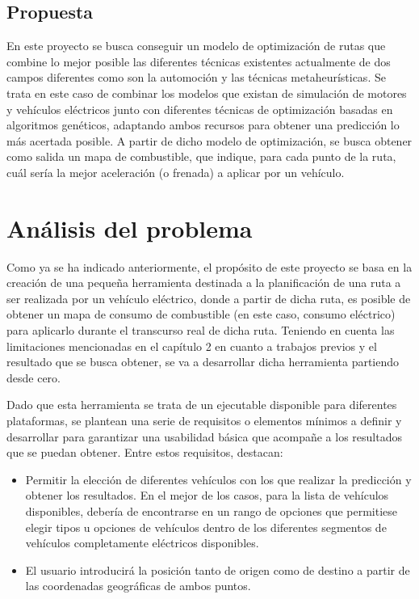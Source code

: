\documentclass[11pt,spanish,listoffigures,listoftables]{tfgetsinf}
\begin{document}
\section{Propuesta}
En este proyecto se busca conseguir un modelo de optimización de rutas que combine lo mejor posible las diferentes técnicas existentes actualmente de dos campos diferentes como son la automoción y las técnicas metaheurísticas. Se trata en este caso de combinar los modelos que existan de simulación de motores y vehículos eléctricos junto con diferentes técnicas de optimización basadas en algoritmos genéticos, adaptando ambos recursos para obtener una predicción lo más acertada posible. A partir de dicho modelo de optimización, se busca obtener como salida un mapa de combustible, que indique, para cada punto de la ruta, cuál sería la mejor aceleración (o frenada) a aplicar por un vehículo.

\chapter{Análisis del problema}
\label{AnalisisProblema}
Como ya se ha indicado anteriormente, el propósito de este proyecto se basa en la creación de una pequeña herramienta destinada a la planificación de una ruta a ser realizada por un vehículo eléctrico, donde a partir de dicha ruta, es posible de obtener un mapa de consumo de combustible (en este caso, consumo eléctrico) para aplicarlo durante el transcurso real de dicha ruta. Teniendo en cuenta las limitaciones mencionadas en el capítulo 2 en cuanto a trabajos previos y el resultado que se busca obtener, se va a desarrollar dicha herramienta partiendo desde cero.

Dado que esta herramienta se trata de un ejecutable disponible para diferentes plataformas, se plantean una serie de requisitos o elementos mínimos a definir y desarrollar para garantizar una usabilidad básica que acompañe a los resultados que se puedan obtener. Entre estos requisitos, destacan:

\begin{itemize}
    \item Permitir la elección de diferentes vehículos con los que realizar la predicción y obtener los resultados. En el mejor de los casos, para la lista de vehículos disponibles, debería de encontrarse en un rango de opciones que permitiese elegir tipos u opciones de vehículos dentro de los diferentes segmentos de vehículos completamente eléctricos disponibles.
    \item El usuario introducirá la posición tanto de origen como de destino a partir de las coordenadas geográficas de ambos puntos.
\end{itemize}
\end{document}
